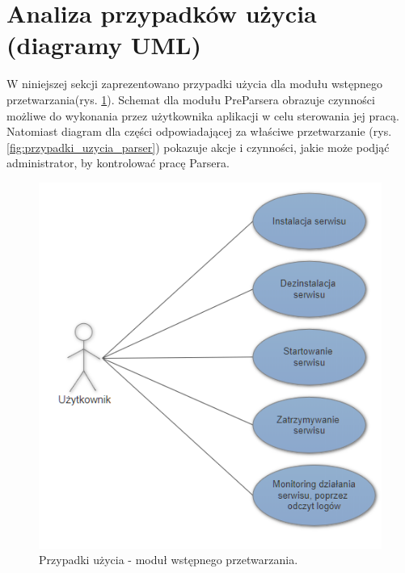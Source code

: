 \documentclass[a4paper]{book}
\begin{document}
\section{Analiza przypadków użycia (diagramy UML)}
W niniejszej sekcji zaprezentowano przypadki użycia dla modułu wstępnego przetwarzania(rys. \ref{fig:przypadki_uzycia_preparser}). Schemat dla modułu PreParsera obrazuje czynności możliwe do wykonania przez użytkownika aplikacji w celu sterowania jej pracą. Natomiast diagram dla części odpowiadającej za właściwe przetwarzanie (rys. \ref{fig:przypadki_uzycia_parser}) pokazuje akcje i czynności, jakie może podjąć administrator, by kontrolować pracę Parsera.
\begin{figure}[t]
	\centering
	\includegraphics[width=\textwidth]{./img/przypadki_uzycia_preparser.png}
	\caption{Przypadki użycia - moduł wstępnego przetwarzania.}
	\label{fig:przypadki_uzycia_preparser}
\end{figure}
\end{document}
